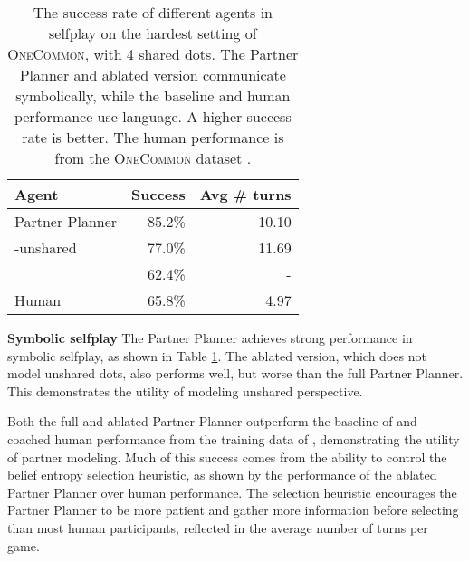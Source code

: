 \documentclass[11pt]{article}
\begin{document}
\begin{table}[!t]
\centering
\begin{tabular}{lrr}
\toprule
Agent                   & Success & Avg \# turns\\
\midrule
Partner Planner         & 85.2\%  & 10.10\\
\quad -unshared         & 77.0\%  & 11.69\\
\citet{fried}           & 62.4\%  & -\\
Human                   & 65.8\%  & 4.97\\
\bottomrule
\end{tabular}
\caption{\label{tbl:selfplay}
The success rate of different agents in selfplay on the hardest setting of \textsc{OneCommon}, with 4 shared dots.
The Partner Planner and ablated version communicate symbolically,
while the \citet{fried} baseline and human
performance use language.
A higher success rate is better.
The human performance is from the \textsc{OneCommon} dataset
\citep{onecommon}.
}
\end{table}

\textbf{Symbolic selfplay}
The Partner Planner achieves strong performance in symbolic selfplay, as shown in Table \ref{tbl:selfplay}.
The ablated version, which does not model unshared dots, also performs well, but worse than the full Partner Planner.
This demonstrates the utility of modeling unshared perspective.

Both the full and ablated Partner Planner outperform the baseline of \citet{fried} and coached human performance from the training data of \citet{onecommon}, demonstrating the utility of partner modeling.
Much of this success comes from the ability to control the
belief entropy selection heuristic, as shown by the performance of the ablated Partner Planner over human performance.
The selection heuristic encourages the Partner Planner to be more patient and gather more information before selecting than most human participants,
reflected in the average number of turns per game.



\begin{comment}
\begin{table}[!t]
\centering
\begin{tabular}{lrr}
\toprule
Agent               & $N$ & Success\\
\midrule
Partner Planner     &  A  & X\%  \\
\citet{fried}       &  B  & Y\% \\
Human               &  C  & Z\% \\
\bottomrule
\end{tabular}
\caption{\label{tbl:human}
The success rate of different agents in human evaluation on the hardest setting of \textsc{OneCommon}, with 4 shared dots.
All agents communicate with a human partner via natural language.
Each agent type plays $N$ games with a human partner.
A higher success rate is better.
}
\end{table}
\end{comment}
\end{document}
